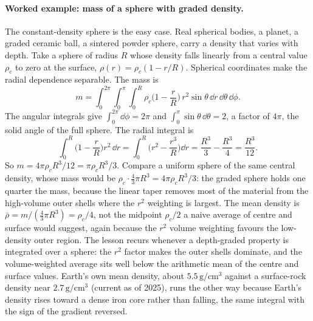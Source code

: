 \paragraph{Worked example: mass of a sphere with graded density.}
The constant-density sphere is the easy case. Real spherical bodies,
a planet, a graded ceramic ball, a sintered powder sphere, carry a
density that varies with depth. Take a sphere of radius $R$ whose
density falls linearly from a central value $\rho_{c}$ to zero at the
surface, $\rho(r) = \rho_{c}(1 - r/R)$. Spherical coordinates make
the radial dependence separable. The mass is
\[
m = \int_{0}^{2\pi}\!\int_{0}^{\pi}\!\int_{0}^{R}
\rho_{c}\Big(1 - \frac{r}{R}\Big)\,r^{2}\sin\theta\,
\dd r\,\dd\theta\,\dd\phi.
\]
The angular integrals give $\int_{0}^{2\pi}\dd\phi = 2\pi$ and
$\int_{0}^{\pi}\sin\theta\,\dd\theta = 2$, a factor of $4\pi$, the
solid angle of the full sphere. The radial integral is
\[
\int_{0}^{R}\Big(1 - \frac{r}{R}\Big)r^{2}\,\dd r
= \int_{0}^{R}\Big(r^{2} - \frac{r^{3}}{R}\Big)\dd r
= \frac{R^{3}}{3} - \frac{R^{3}}{4} = \frac{R^{3}}{12}.
\]
So $m = 4\pi\rho_{c} R^{3}/12 = \pi\rho_{c} R^{3}/3$. Compare a
uniform sphere of the same central density, whose mass would be
$\rho_{c}\cdot\tfrac{4}{3}\pi R^{3} = 4\pi\rho_{c}R^{3}/3$: the
graded sphere holds one quarter the mass, because the linear taper
removes most of the material from the high-volume outer shells where
the $r^{2}$ weighting is largest. The mean density is
$\bar{\rho} = m/(\tfrac{4}{3}\pi R^{3}) = \rho_{c}/4$, not the
midpoint $\rho_{c}/2$ a naive average of centre and surface would
suggest, again because the $r^{2}$ volume weighting favours the
low-density outer region. The lesson recurs whenever a depth-graded
property is integrated over a sphere: the $r^{2}$ factor makes the
outer shells dominate, and the volume-weighted average sits well
below the arithmetic mean of the centre and surface values. Earth's
own mean density, about $5.5\,\si{\gram\per\centi\meter\cubed}$
against a surface-rock density near $2.7\,\si{\gram\per\centi\meter
\cubed}$ (current as of 2025), runs the other way because Earth's
density rises toward a dense iron core rather than falling, the
same integral with the sign of the gradient reversed.

